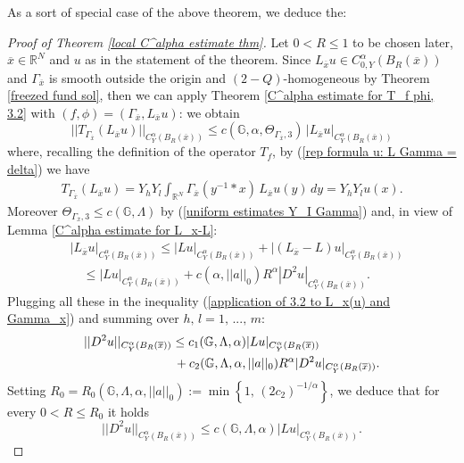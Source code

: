 \documentclass{article}
\numberwithin{equation}{section}
\begin{document}
\vspace{2mm}

\hspace{-7mm} As a sort of special case of the above theorem, we deduce the:

\vspace{2mm}

\begin{proof}[Proof of Theorem \ref{local C^alpha estimate thm}]
    Let $0 < R \leq 1$ to be chosen later, $\overline{x} \in \mathbb{R}^N$ and $u$ as in the statement of the theorem. Since $L_{\overline{x}}u \in C^{\alpha}_{0,Y}(B_{R}(\overline{x}))$ and $\Gamma_{\overline{x}}$ is smooth outside the origin and $(2-Q)$-homogeneous by Theorem \ref{freezed fund sol}, then we can apply Theorem \ref{C^alpha estimate for T_f phi, 3.2} with $(f,\phi)=(\Gamma_{\overline{x}}, L_{\overline{x}}u)$: we obtain
    \begin{equation}
        \label{application of 3.2 to L_x(u) and Gamma_x} ||T_{\Gamma_{\overline{x}}}(L_{\overline{x}}u)||_{C^{\alpha}_Y(B_R(\overline{x}))} \leq c(\mathbb{G}, \alpha, \Theta_{\Gamma_{\overline{x}},3}) \, |L_{\overline{x}}u|_{C^{\alpha}_Y(B_R(\overline{x}))}
    \end{equation}
    where, recalling the definition of the operator $T_f$, by (\ref{rep formula u: L Gamma = delta}) we have
    \begin{align*}
        T_{\Gamma_{\overline{x}}}(L_{\overline{x}}u) = Y_h Y_l \int_{\mathbb{R}^N} \Gamma_{\overline{x}}(y^{-1}*x) \, L_{\overline{x}}u(y) \, dy = Y_h Y_l u(x).
    \end{align*}
    Moreover $\Theta_{\Gamma_{\overline{x}},3} \leq c(\mathbb{G}, \Lambda)$ by (\ref{uniform estimates Y_I Gamma}) and, in view of Lemma \ref{C^alpha estimate for L_x-L}:
    \begin{align*}
        & |L_{\overline{x}}u|_{C^{\alpha}_Y(B_R(\overline{x}))} \leq |Lu|_{C^{\alpha}_Y(B_R(\overline{x}))} + |(L_{\overline{x}}-L)u|_{C^{\alpha}_Y(B_R(\overline{x}))} \\
        & \quad \leq |Lu|_{C^{\alpha}_Y(B_R(\overline{x}))} + c(\alpha, ||a||_0) R^{\alpha} |D^2 u|_{C^{\alpha}_Y(B_R(\overline{x}))}.
    \end{align*}
    Plugging all these in the inequality (\ref{application of 3.2 to L_x(u) and Gamma_x}) and summing over $h, \, l=1, \, ..., \, m$:
    \begin{align*}
        & ||D^2  u||_{C^{\alpha}_Y(B_R(\overline{x}))} \leq c_1(\mathbb{G}, \Lambda, \alpha) |Lu|_{C^{\alpha}_Y(B_R(\overline{x}))}  \\
        & \hspace{2.55cm} + c_2(\mathbb{G}, \Lambda, \alpha, ||a||_0) R^{\alpha} |D^2u|_{C^{\alpha}_Y(B_R(\overline{x}))}.
    \end{align*}
    Setting $R_0=R_0(\mathbb{G}, \Lambda, \alpha, ||a||_0):=\min\left\{1, \, (2c_2)^{-1/\alpha} \right\}$, we deduce that for every $0 < R \leq R_0$ it holds
    \begin{equation*}
        ||D^2 u||_{C^{\alpha}_Y(B_R(\overline{x}))} \leq c(\mathbb{G}, \Lambda, \alpha) |Lu|_{C^{\alpha}_Y(B_R(\overline{x}))}.
    \end{equation*}
\end{proof}
\end{document}
